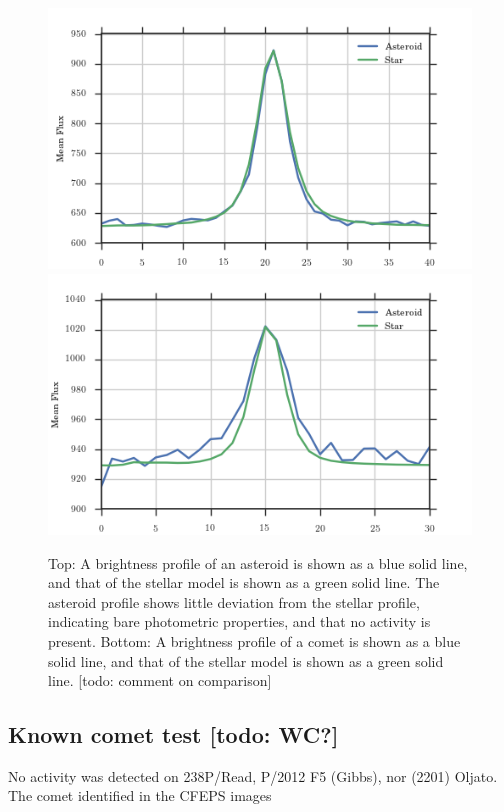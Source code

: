 \documentclass[iop,apj]{emulateapj}
\begin{document}
\begin{figure}[!htb]
    \centering
    \includegraphics[width=\linewidth]{images/asteroid_profile.png}
    \includegraphics[width=\linewidth]{images/238P_profile.png}
    \caption{Top: A brightness profile of an asteroid is shown as a blue solid line, and that of the stellar model is shown as a green solid line. The asteroid profile shows little deviation from the stellar profile, indicating bare photometric properties, and that no activity is present. Bottom: A brightness profile of a comet is shown as a blue solid line, and that of the stellar model is shown as a green solid line. [todo: comment on comparison]}\label{fig:4}
\end{figure}

\subsection{Known comet test [todo: WC?]}

No activity was detected on 238P/Read, P/2012 F5 (Gibbs), nor (2201) Oljato. The comet identified in the CFEPS images 
\end{document}
